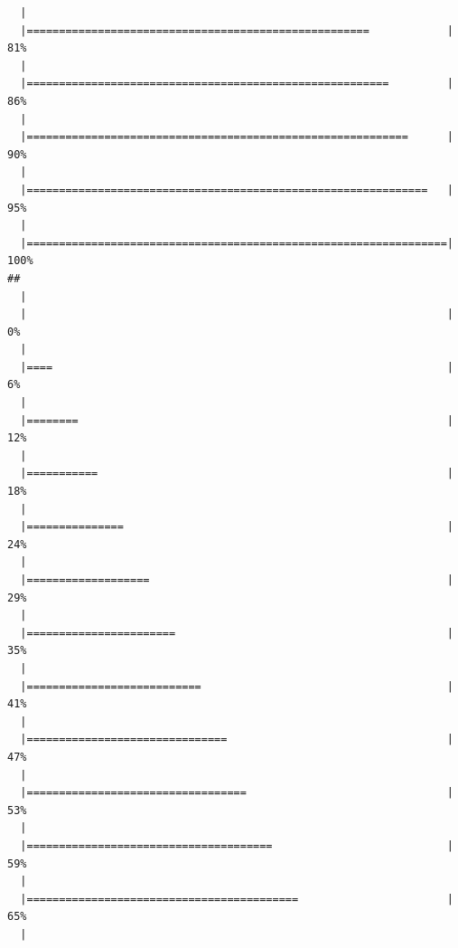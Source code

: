 \documentclass[10pt,A4,]{article}
\begin{document}
\begin{verbatim}
  |                                                                       
  |=====================================================            |  81%
  |                                                                       
  |========================================================         |  86%
  |                                                                       
  |===========================================================      |  90%
  |                                                                       
  |==============================================================   |  95%
  |                                                                       
  |=================================================================| 100%
## 
  |                                                                       
  |                                                                 |   0%
  |                                                                       
  |====                                                             |   6%
  |                                                                       
  |========                                                         |  12%
  |                                                                       
  |===========                                                      |  18%
  |                                                                       
  |===============                                                  |  24%
  |                                                                       
  |===================                                              |  29%
  |                                                                       
  |=======================                                          |  35%
  |                                                                       
  |===========================                                      |  41%
  |                                                                       
  |===============================                                  |  47%
  |                                                                       
  |==================================                               |  53%
  |                                                                       
  |======================================                           |  59%
  |                                                                       
  |==========================================                       |  65%
  |                                                                       

\end{verbatim}
\end{document}
